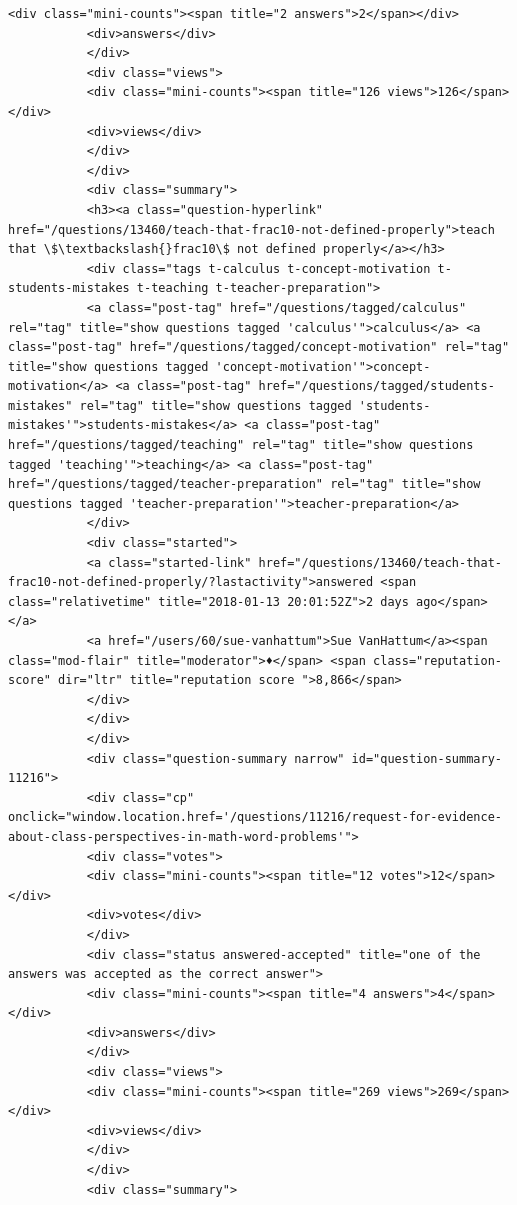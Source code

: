 \documentclass[11pt]{article}
\begin{document}
\begin{Verbatim}[commandchars=\\\{\}]
           <div class="mini-counts"><span title="2 answers">2</span></div>
           <div>answers</div>
           </div>
           <div class="views">
           <div class="mini-counts"><span title="126 views">126</span></div>
           <div>views</div>
           </div>
           </div>
           <div class="summary">
           <h3><a class="question-hyperlink" href="/questions/13460/teach-that-frac10-not-defined-properly">teach that \$\textbackslash{}frac10\$ not defined properly</a></h3>
           <div class="tags t-calculus t-concept-motivation t-students-mistakes t-teaching t-teacher-preparation">
           <a class="post-tag" href="/questions/tagged/calculus" rel="tag" title="show questions tagged 'calculus'">calculus</a> <a class="post-tag" href="/questions/tagged/concept-motivation" rel="tag" title="show questions tagged 'concept-motivation'">concept-motivation</a> <a class="post-tag" href="/questions/tagged/students-mistakes" rel="tag" title="show questions tagged 'students-mistakes'">students-mistakes</a> <a class="post-tag" href="/questions/tagged/teaching" rel="tag" title="show questions tagged 'teaching'">teaching</a> <a class="post-tag" href="/questions/tagged/teacher-preparation" rel="tag" title="show questions tagged 'teacher-preparation'">teacher-preparation</a>
           </div>
           <div class="started">
           <a class="started-link" href="/questions/13460/teach-that-frac10-not-defined-properly/?lastactivity">answered <span class="relativetime" title="2018-01-13 20:01:52Z">2 days ago</span></a>
           <a href="/users/60/sue-vanhattum">Sue VanHattum</a><span class="mod-flair" title="moderator">♦</span> <span class="reputation-score" dir="ltr" title="reputation score ">8,866</span>
           </div>
           </div>
           </div>
           <div class="question-summary narrow" id="question-summary-11216">
           <div class="cp" onclick="window.location.href='/questions/11216/request-for-evidence-about-class-perspectives-in-math-word-problems'">
           <div class="votes">
           <div class="mini-counts"><span title="12 votes">12</span></div>
           <div>votes</div>
           </div>
           <div class="status answered-accepted" title="one of the answers was accepted as the correct answer">
           <div class="mini-counts"><span title="4 answers">4</span></div>
           <div>answers</div>
           </div>
           <div class="views">
           <div class="mini-counts"><span title="269 views">269</span></div>
           <div>views</div>
           </div>
           </div>
           <div class="summary">

\end{Verbatim}
\end{document}
